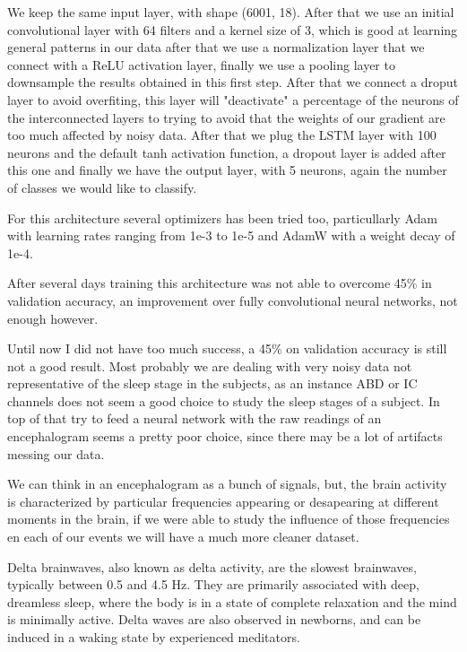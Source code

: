 We keep the same input layer, with shape (6001, 18). After that we use an initial convolutional layer with 64 filters and a kernel size of 3, which is good at learning general patterns in our data after that we use a normalization layer that we connect with a ReLU activation layer, finally we use a pooling layer to downsample the results obtained in this first step. After that we connect a droput layer to avoid overfiting, this layer will "deactivate" a percentage of the neurons of the interconnected layers to trying to avoid that the weights of our gradient are too much affected by noisy data. After that we plug the LSTM layer with 100 neurons and the default tanh activation function, a dropout layer is added after this one and finally we have the output layer, with 5 neurons, again the number of classes we would like to classify.

For this architecture several optimizers has been tried too, particullarly Adam with learning rates ranging from 1e-3 to 1e-5 and AdamW with a weight decay of 1e-4.

After several days training this architecture was not able to overcome 45\% in validation accuracy, an improvement over fully convolutional neural networks, not enough however.

Until now I did not have too much success, a 45\% on validation accuracy is still not a good result. Most probably we are dealing with very noisy data not representative of the sleep stage in the subjects, as an instance ABD or IC channels does not seem a good choice to study the sleep stages of a subject. In top of that try to feed a neural network with the raw readings of an encephalogram seems a pretty poor choice, since there may be a lot of artifacts messing our data.

We can think in an encephalogram as a bunch of signals, but, the brain activity is characterized by particular frequencies appearing or desapearing at different moments in the brain, if we were able to study the influence of those frequencies en each of our events we will have a much more cleaner dataset.

Delta brainwaves, also known as delta activity, are the slowest brainwaves, typically between 0.5 and 4.5 Hz. They are primarily associated with deep, dreamless sleep, where the body is in a state of complete relaxation and the mind is minimally active. Delta waves are also observed in newborns, and can be induced in a waking state by experienced meditators.


